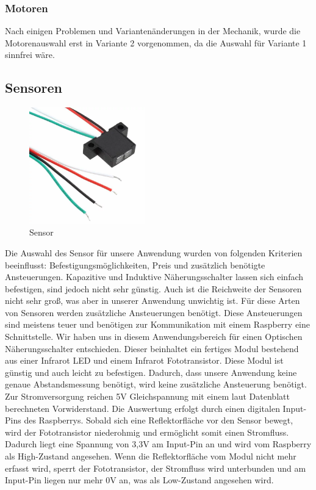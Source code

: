 \subsubsection{Motoren}
Nach einigen Problemen und Variantenänderungen in der Mechanik, wurde die Motorenauswahl erst in Variante 2 vorgenommen, da die Auswahl für Variante 1 sinnfrei wäre.

\subsection{Sensoren}
\begin{figure}[H] 
\begin{center}

\includegraphics[width=5cm]{Bilder/Bauteile/Sensor}
\caption{Sensor}
\label{Sensor}

\end{center}
\end{figure}
Die Auswahl des Sensor für unsere Anwendung wurden von folgenden Kriterien beeinflusst: Befestigungsmöglichkeiten, Preis und zusätzlich benötigte Ansteuerungen.
Kapazitive und Induktive Näherungsschalter lassen sich einfach befestigen, sind jedoch nicht sehr günstig. Auch ist die Reichweite der Sensoren nicht sehr groß, was aber in unserer Anwendung unwichtig ist. Für diese Arten von Sensoren werden zusätzliche Ansteuerungen benötigt. Diese Ansteuerungen sind meistens teuer und benötigen zur Kommunikation mit einem Raspberry eine Schnittstelle.
Wir haben uns in diesem Anwendungsbereich für einen Optischen Näherungsschalter entschieden. Dieser beinhaltet ein fertiges Modul bestehend aus einer Infrarot LED und einem Infrarot Fototransistor. Diese Modul ist günstig und auch leicht zu befestigen. Dadurch, dass unsere Anwendung keine genaue Abstandsmessung benötigt, wird keine zusätzliche Ansteuerung benötigt. Zur Stromversorgung reichen 5V Gleichspannung mit einem laut Datenblatt berechneten Vorwiderstand. Die Auswertung erfolgt durch einen digitalen Input-Pins des Raspberrys. Sobald sich eine Reflektorfläche vor den Sensor bewegt, wird der Fototransistor niederohmig und ermöglicht somit einen Stromfluss. Dadurch liegt eine Spannung von 3,3V am Input-Pin an und wird vom Raspberry als High-Zustand angesehen. Wenn die Reflektorfläche vom Modul nicht mehr erfasst wird, sperrt der Fototransistor, der Stromfluss wird unterbunden und am Input-Pin liegen nur mehr 0V an, was als Low-Zustand angesehen wird. \\


